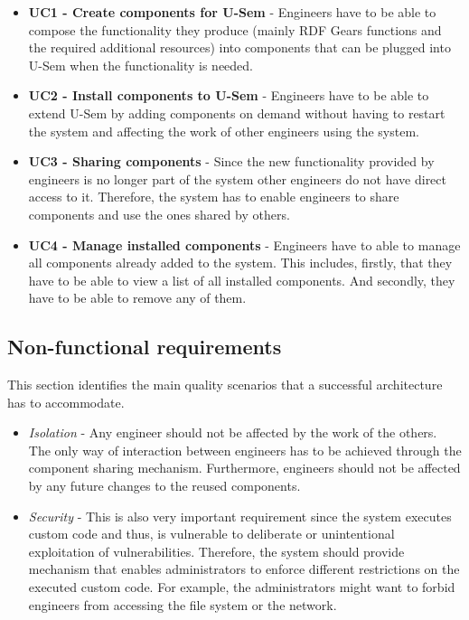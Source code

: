 \begin{itemize}

	\item \textbf{UC1 - Create components for U-Sem} - Engineers have to be able to compose the functionality they produce (mainly RDF Gears functions and the required additional resources) into components that can be plugged into U-Sem when the functionality is needed.
	
	\item \textbf{UC2 - Install components to U-Sem} - Engineers have to be able to extend U-Sem by adding components on demand without having to restart the system and affecting the work of other engineers using the system.
	
	\item \textbf{UC3 - Sharing components} - Since the new functionality provided by engineers is no longer part of the system other engineers do not have direct access to it. Therefore, the system has to enable engineers to share components and use the ones shared by others.
	
	\item \textbf{UC4 - Manage installed components} - Engineers have to able to manage all components already added to the system. This includes, firstly, that they have to be able to view a list of all installed components. And secondly, they have to be able to remove any of them.
			
\end{itemize}

\subsection{Non-functional requirements}

This section identifies the main quality scenarios that a successful architecture has to accommodate. 

\begin{itemize}
	
	\item \textit{Isolation} - Any engineer should not be affected by the work of the others. The only way of interaction between engineers has to be achieved through the component sharing mechanism. Furthermore, engineers should not be affected by any future changes to the reused components.
		
	\item \textit{Security} - This is also very important requirement since the system executes custom code and thus, is vulnerable to deliberate or unintentional exploitation of vulnerabilities. Therefore, the system should provide mechanism that enables administrators to enforce different restrictions on the executed custom code. For example, the administrators might want to forbid engineers from accessing the file system or the network.
	
\end{itemize}

